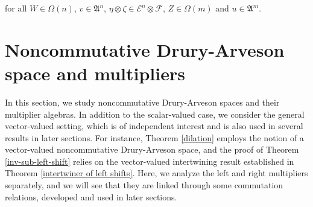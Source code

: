 \documentclass[12pt]{amsart}%
\numberwithin{equation}{section}
\newcommand{\fA}{{\mathfrak{A}}}
\newcommand{\cle}{\mathcal{E}}
\newcommand{\clf}{\mathcal{F}}
\begin{document}
for all $W\in \Omega(n)$, $v\in \fA^n$, $\eta\otimes \zeta\in \cle^n\otimes \clf$, $Z\in \Omega(m)$ and $u\in \fA^m$.

   
    

\section{Noncommutative Drury-Arveson space and multipliers}\label{vector-valued-Drury}
In this section, we study noncommutative Drury-Arveson spaces and their multiplier algebras. In addition to the scalar-valued case, we consider the general vector-valued setting, which is of independent interest and is also used in several results in later sections. For instance, Theorem \ref{dilation} employs the notion of a vector-valued noncommutative Drury-Arveson space, and the proof of Theorem \ref{inv-sub-left-shift} relies on the vector-valued intertwining result established in Theorem \ref{intertwiner of left shifts}. Here, we analyze the left and right multipliers separately, and we will see that they are linked through some commutation relations, developed and used in later sections. 
\end{document}
